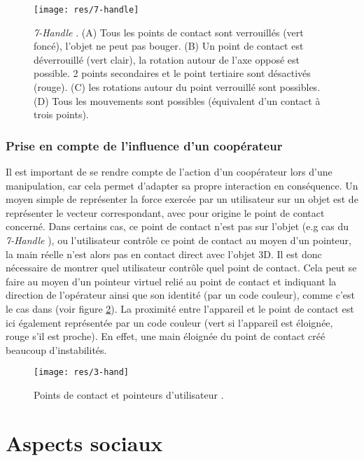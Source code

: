 \documentclass[11pt]{article}
\begin{document}
\begin{figure}
\centering
\texttt{[image: res/7-handle]}
\caption{\label{fig:7-handler}\textit{7-Handle} \cite{thesis}. (A) Tous les points de contact sont verrouillés (vert foncé), l'objet ne peut pas bouger. (B) Un point de contact est déverrouillé (vert clair), la rotation autour de l'axe opposé est possible. 2 points secondaires et le point tertiaire sont désactivés (rouge). (C) les rotations autour du point verrouillé sont possibles. (D) Tous les mouvements sont possibles (équivalent d'un contact à trois points).}
\end{figure}

\subsubsection{Prise en compte de l'influence d'un coopérateur}
Il est important de se rendre compte de l'action d'un coopérateur lors d'une manipulation, car cela permet d'adapter sa propre interaction en conséquence. Un moyen simple de représenter la force exercée par un utilisateur sur un objet est de représenter le vecteur correspondant, avec pour origine le point de contact concerné. Dans certains cas, ce point de contact n'est pas sur l'objet (e.g cas du \textit{7-Handle} \cite{thesis}), ou l'utilisateur contr\^ole ce point de contact au moyen d'un pointeur, la main réelle n'est alors pas en contact direct avec l'objet 3D. Il est donc nécessaire de montrer quel utilisateur contr\^ole quel point de contact. Cela peut se faire au moyen d'un pointeur virtuel relié au point de contact et indiquant la direction de l'opérateur ainsi que son identité (par un code couleur), comme c'est le cas dans \cite{3-hand} (voir figure \ref{fig:3-hand}). La proximité entre l'appareil et le point de contact est ici également représentée par un code couleur (vert si l'appareil est éloignée, rouge s'il est proche). En effet, une main éloignée du point de contact créé beaucoup d'instabilités. 

\begin{figure}
\centering
\texttt{[image: res/3-hand]}
\caption{\label{fig:3-hand}Points de contact et pointeurs d'utilisateur \cite{3-hand}.}
\end{figure}

\section{Aspects sociaux}
\label{sec:social}
\end{document}
